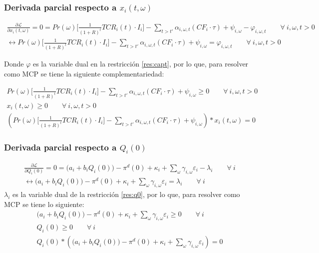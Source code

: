 \subsubsection{Derivada parcial respecto a $x_i(t,\omega)$}
\footnotesize{
\begin{align}
    \frac{\partial \mathcal{L} }{\partial x_i(t,\omega)}= 0 = Pr(\omega) \Bigg[\frac{1}{(1+R)^t}TCR_i(t) \cdot I_i \Bigg] - \sum_{t> t\prime}\alpha_{i,\omega,t} ( CF_i \cdot \tau)+ \psi_{i,\omega}-\varphi_{i,\omega,t} \qquad  \forall \  i, \omega, t> 0\\
    \leftrightarrow Pr(\omega) \Bigg[\frac{1}{(1+R)^t}TCR_i(t) \cdot I_i \Bigg] - \sum_{t> t\prime}\alpha_{i,\omega,t} ( CF_i \cdot \tau)+ \psi_{i,\omega}=\varphi_{i,\omega,t} \qquad  \forall \  i, \omega, t> 0
\end{align}
}

Donde $\varphi$ es la variable dual en la restricción \ref{res:capt}, por lo que, para resolver como MCP se tiene la siguiente complementariedad:


\footnotesize{
\begin{align}
    Pr(\omega) \Bigg[\frac{1}{(1+R)^t}TCR_i(t) \cdot I_i \Bigg] - \sum_{t> t\prime}\alpha_{i,\omega,t} ( CF_i \cdot \tau)+ \psi_{i,\omega} \geq 0 \qquad  \forall \  i, \omega, t> 0\\
    x_i(t,\omega) \geq 0 \qquad  \forall \  i, \omega, t> 0\\
    (Pr(\omega) \Bigg[\frac{1}{(1+R)^t}TCR_i(t) \cdot I_i \Bigg] - \sum_{t> t\prime}\alpha_{i,\omega,t} ( CF_i \cdot \tau)+ \psi_{i,\omega})*x_i(t,\omega)=0
\end{align}
}

\subsubsection{Derivada parcial respecto a $Q_i(0)$}
\footnotesize{
\begin{align}
    \frac{\partial \mathcal{L} }{\partial Q_i(0)}= 0 =  \big(a_{i}+b_i Q_{i}(0)\big)-\pi^d(0) + \kappa_i  + \sum_{\omega} \gamma_{i,\omega}\varepsilon_i-\lambda_i \qquad \forall \  i  \\
     \leftrightarrow \big(a_{i}+b_i Q_{i}(0)\big)-\pi^d(0) + \kappa_i  + \sum_{\omega} \gamma_{i,\omega}\varepsilon_i = \lambda_i \qquad \forall \  i
\end{align}
}
$\lambda_i$ es la variable dual de la restricción \ref{res:q0}, por lo que, para resolver como MCP se tiene lo siguiente:
\footnotesize{
\begin{align}
    \big(a_{i}+b_i Q_{i}(0)\big)-\pi^d(0) + \kappa_i  + \sum_{\omega} \gamma_{i,\omega}\varepsilon_i \geq 0 \qquad \forall \  i  \\
    Q_i(0) \geq 0 \qquad \forall \  i  \\
    Q_i(0)*( \big(a_{i}+b_i Q_{i}(0)\big)-\pi^d(0) + \kappa_i  + \sum_{\omega} \gamma_{i,\omega}\varepsilon_i)=0 
\end{align}
}

